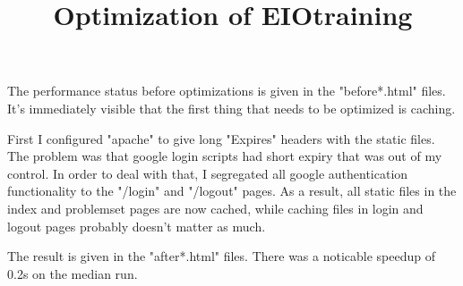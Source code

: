\documentclass{article}
\begin{document}
\title{Optimization of EIOtraining}
\maketitle

The performance status before optimizations is given in the "before*.html" files. It's immediately visible that the first thing that needs to be optimized is caching.

First I configured "apache" to give long "Expires" headers with the static files. The problem was that google login scripts had short expiry that was out of my control. In order to deal with that, I segregated all google authentication functionality to the "/login" and "/logout" pages. As a result, all static files in the index and problemset pages are now cached, while caching files in login and logout pages probably doesn't matter as much.

The result is given in the "after*.html" files. There was a noticable speedup of 0.2s on the median run.
\end{document}

